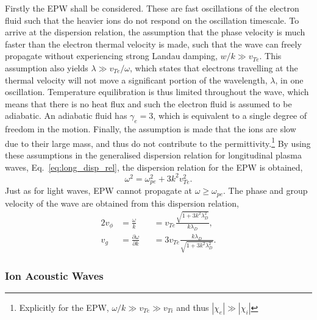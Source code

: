 Firstly the \ac{EPW} shall be considered.
These are fast oscillations of the electron fluid such that the heavier ions do not respond on the oscillation timescale.
To arrive at the dispersion relation, the assumption that the phase velocity is much faster than the electron thermal velocity is made, such that the wave can freely propagate without experiencing strong Landau damping, $w/k \gg v_{Te}$.
This assumption also yields $\lambda \gg v_{Te}/\omega$, which states that electrons travelling at the thermal velocity will not move a significant portion of the wavelength, $\lambda$, in one oscillation.
Temperature equilibration is thus limited throughout the wave, which means that there is no heat flux and such the electron fluid is assumed to be adiabatic.
An adiabatic fluid has $\gamma_e=3$, which is equivalent to a single degree of freedom in the motion.
Finally, the assumption is made that the ions are slow due to their large mass, and thus do not contribute to the permittivity.\footnote{Explicitly for the \ac{EPW}, $\omega/k \gg v_{Te} \gg v_{Ti}$ and thus $|\chi_e| \gg |\chi_i|$}
By using these assumptions in the generalised dispersion relation for longitudinal plasma waves, Eq.~\ref{eq:long_disp_rel}, the dispersion relation for the \ac{EPW} is obtained,
\begin{equation}
    \omega^2 = \omega_{pe}^2 + 3k^2v_{Te}^2.
\end{equation}
Just as for light waves, \ac{EPW} cannot propagate at $\omega\geq\omega_{pe}$.
The phase and group velocity of the wave are obtained from this dispersion relation,
\begin{alignat}{2}
    v_\phi &= \frac{\omega}{k} &&= v_{Te}\frac{\sqrt{1+3k^2\lambda_{D}^2}}{k\lambda_D},\\
    v_g &= \frac{\partial \omega}{\partial k} &&= 3v_{Te}\frac{k\lambda_D}{\sqrt{1+3k^2\lambda_{D}^2}}.
\end{alignat}

\subsubsection{Ion Acoustic Waves}%
\label{sec:theory_IAWs}

